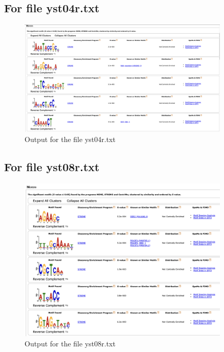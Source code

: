 \documentclass{report}
\begin{document}
\clearpage
\FloatBarrier
\subsection{For file yst04r.txt}
\begin{figure}[ht]
    \centering
    \includegraphics[width=0.9\textwidth]{MEME_CHIP/MEME_CHIP yst04r.png} 
    \caption{Output for the file yst04r.txt}
    \label{fig:ui2.4}
\end{figure}

\clearpage
\FloatBarrier
\subsection{For file yst08r.txt}
\begin{figure}[ht]
    \centering
    \includegraphics[width=0.9\textwidth]{MEME_CHIP/MEME_CHIP yst08r.png} 
    \caption{Output for the file yst08r.txt}
    \label{fig:ui2.4}
\end{figure}

\FloatBarrier
\end{document}
